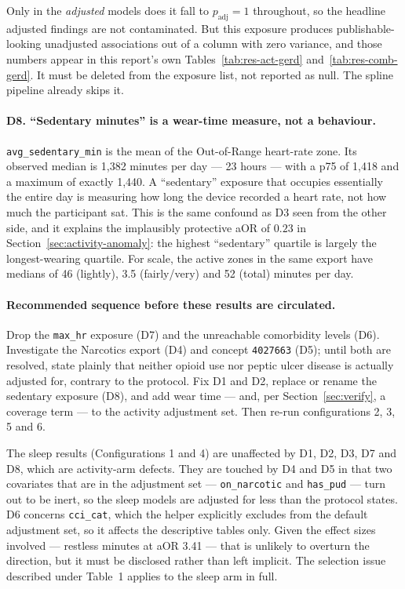 \documentclass[11pt]{article}
\newcommand{\code}[1]{\texttt{\small #1}}
\begin{document}
Only in the \emph{adjusted} models does it fall to $p_{\text{adj}} = 1$ throughout, so the
headline adjusted findings are not contaminated. But this exposure produces publishable-looking
unadjusted associations out of a column with zero variance, and those numbers appear in this
report's own Tables~\ref{tab:res-act-gerd} and~\ref{tab:res-comb-gerd}. It must be deleted from the
exposure list, not reported as null. The spline pipeline already skips it.

\paragraph{D8. ``Sedentary minutes'' is a wear-time measure, not a behaviour.}
\code{avg_sedentary_min} is the mean of the Out-of-Range heart-rate zone. Its observed median is
1{,}382 minutes per day --- 23 hours --- with a p75 of 1{,}418 and a maximum of exactly 1{,}440.
A ``sedentary'' exposure that occupies essentially the entire day is measuring how long the device
recorded a heart rate, not how much the participant sat. This is the same confound as D3 seen from
the other side, and it explains the implausibly protective aOR of $0.23$ in
Section~\ref{sec:activity-anomaly}: the highest ``sedentary'' quartile is largely the
longest-wearing quartile. For scale, the active zones in the same export have medians of 46
(lightly), 3.5 (fairly/very) and 52 (total) minutes per day.

\paragraph{Recommended sequence before these results are circulated.}
Drop the \code{max_hr} exposure (D7) and the unreachable comorbidity levels (D6). Investigate the
Narcotics export (D4) and concept \code{4027663} (D5); until both are resolved, state plainly that
neither opioid use nor peptic ulcer disease is actually adjusted for, contrary to the protocol.
Fix D1 and D2, replace or rename the sedentary exposure (D8), and add wear time --- and, per
Section~\ref{sec:verify}, a coverage term --- to the activity adjustment set. Then re-run
configurations 2, 3, 5 and 6.

The sleep results (Configurations 1 and 4) are unaffected by D1, D2, D3, D7 and D8, which are
activity-arm defects. They are touched by D4 and D5 in that two covariates that are in the
adjustment set --- \code{on_narcotic} and \code{has_pud} --- turn out to be inert, so the sleep
models are adjusted for less than the protocol states. D6 concerns \code{cci_cat}, which the helper
explicitly excludes from the default adjustment set, so it affects the descriptive tables only. Given
the effect sizes involved --- restless minutes at aOR 3.41 --- that is unlikely to overturn the
direction, but it must be disclosed rather than left implicit. The selection issue described under
Table~1 applies to the sleep arm in full.
\end{document}
